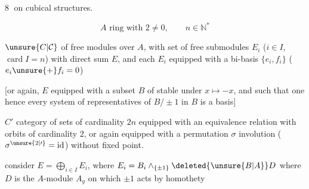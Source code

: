 \textcircled{8}  on cubical structures.

\[
 A\text{ ring with }2\ne0,\qquad n\in\mathbb{N}^{*}
\]

$\unsure{C|\mathcal{C}}$  of free modules  over $A$, with  set of  free submodules $E_i$ ($i\in I$, $\operatorname{card} I=n$) with direct sum $E$, and each $E_i$ equipped with a bi-basis $\{e_i,f_i\}$ ($e_i\unsure{+}f_i=0$)

[or again, $E$ equipped with a subset $B$ of  stable under $x\longmapsto-x$, and such that one \textendash{} hence every \textendash{} system of representatives of $B/\pm1$ in $B$ is a basis]

\diagram{\begin{tikzcd}[ampersand replacement=\&,row sep=small]
 {}\arrow[d,"\wr"']\\ {}
\end{tikzcd}}
$C'$ category of sets  of cardinality $2n$ equipped with an equivalence relation  with orbits of cardinality $2$, or again equipped with a permutation $\sigma$ involution ($\sigma^{\unsure{2|\prime}}=\mathrm{id}$) without fixed point.

consider $E=\bigoplus_{i\in I}E_i$, where $E_i=B_i\wedge_{\{\pm1\}}\deleted{\unsure{B|A}}D$ where $D$ is the $A$-module $A_g$ on which $\pm1$ acts by homothety
